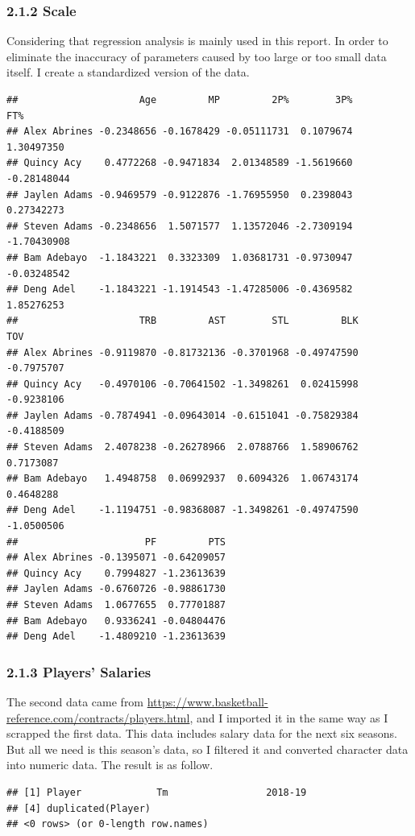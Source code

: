 \documentclass[]{article}
\begin{document}
\subsubsection{2.1.2 Scale}\label{scale}

Considering that regression analysis is mainly used in this report. In
order to eliminate the inaccuracy of parameters caused by too large or
too small data itself. I create a standardized version of the data.

\begin{verbatim}
##                     Age         MP         2P%        3P%         FT%
## Alex Abrines -0.2348656 -0.1678429 -0.05111731  0.1079674  1.30497350
## Quincy Acy    0.4772268 -0.9471834  2.01348589 -1.5619660 -0.28148044
## Jaylen Adams -0.9469579 -0.9122876 -1.76955950  0.2398043  0.27342273
## Steven Adams -0.2348656  1.5071577  1.13572046 -2.7309194 -1.70430908
## Bam Adebayo  -1.1843221  0.3323309  1.03681731 -0.9730947 -0.03248542
## Deng Adel    -1.1843221 -1.1914543 -1.47285006 -0.4369582  1.85276253
##                     TRB         AST        STL         BLK        TOV
## Alex Abrines -0.9119870 -0.81732136 -0.3701968 -0.49747590 -0.7975707
## Quincy Acy   -0.4970106 -0.70641502 -1.3498261  0.02415998 -0.9238106
## Jaylen Adams -0.7874941 -0.09643014 -0.6151041 -0.75829384 -0.4188509
## Steven Adams  2.4078238 -0.26278966  2.0788766  1.58906762  0.7173087
## Bam Adebayo   1.4948758  0.06992937  0.6094326  1.06743174  0.4648288
## Deng Adel    -1.1194751 -0.98368087 -1.3498261 -0.49747590 -1.0500506
##                      PF         PTS
## Alex Abrines -0.1395071 -0.64209057
## Quincy Acy    0.7994827 -1.23613639
## Jaylen Adams -0.6760726 -0.98861730
## Steven Adams  1.0677655  0.77701887
## Bam Adebayo   0.9336241 -0.04804476
## Deng Adel    -1.4809210 -1.23613639
\end{verbatim}

\subsubsection{2.1.3 Players' Salaries}\label{players-salaries}

The second data came from
\url{https://www.basketball-reference.com/contracts/players.html}, and I
imported it in the same way as I scrapped the first data. This data
includes salary data for the next six seasons. But all we need is this
season's data, so I filtered it and converted character data into
numeric data. The result is as follow.

\begin{verbatim}
## [1] Player             Tm                 2018-19           
## [4] duplicated(Player)
## <0 rows> (or 0-length row.names)
\end{verbatim}
\end{document}
